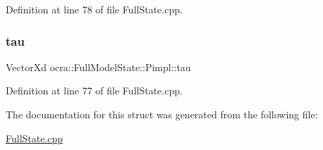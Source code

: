 Definition at line 78 of file Full\+State.\+cpp.

\hypertarget{structocra_1_1FullModelState_1_1Pimpl_a451de435a3d80fdc760ab0d37cbad664}{}\label{structocra_1_1FullModelState_1_1Pimpl_a451de435a3d80fdc760ab0d37cbad664} 
\subsubsection{\texorpdfstring{tau}{tau}}
{\footnotesize\ttfamily Vector\+Xd ocra\+::\+Full\+Model\+State\+::\+Pimpl\+::tau}



Definition at line 77 of file Full\+State.\+cpp.



The documentation for this struct was generated from the following file\+:\begin{DoxyCompactItemize}
\item 
\hyperlink{FullState_8cpp}{Full\+State.\+cpp}\end{DoxyCompactItemize}
